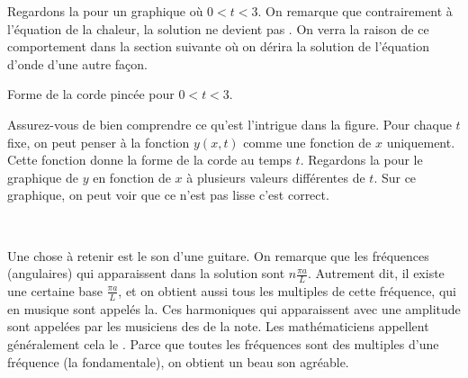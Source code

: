 \begin{example}
Regardons la 
 pour un graphique où
 $0 < t < 3$.  On remarque 
que contrairement à l'équation de la chaleur,  la solution ne devient pas
.  On verra la raison de ce comportement dans la
section suivante où on dérira la solution de l'équation d'onde d'une autre
façon.

\begin{myfig}
\capstart
{}
\caption{Forme de la corde pincée pour $0 < t < 3$.\label{wave:pluckedexfig}}
\end{myfig}

Assurez-vous de bien comprendre ce qu'est l'intrigue dans la figure.  Pour chaque $ t $ fixe,  on peut penser à la fonction
$ y (x, t) $ comme une fonction de $ x $ uniquement.  Cette fonction donne la forme de la corde
au temps $ t $.  Regardons la   pour le graphique de $ y $ en fonction de $ x $ à plusieurs valeurs différentes de $ t $.
Sur ce graphique,  on peut voir que ce n'est pas lisse c'est correct.  

\begin{myfig}
\capstart
\\[5pt]
\caption{La corde pincée pour $t=0$, $t=0.4$, $t=0.8$,  et
$t=1.2$.%
\label{wave:pluckedtsfig}}
\end{myfig}
\end{example}

Une chose à retenir est le son d'une guitare.  On remarque que
les fréquences (angulaires) qui apparaissent dans la solution sont
$n \frac{\pi a}{L}$.  Autrement dit, il existe une certaine base
\emph{} $\frac{\pi a}{L}$,  et on obtient aussi
tous les multiples de cette fréquence,  qui en musique sont appelés
la\emph{}.  Ces harmoniques qui apparaissent avec une amplitude sont 
appelées par les musiciens des  \emph{} de la note.
Les mathématiciens appellent généralement cela le \emph{}.
Parce que toutes les fréquences sont des multiples d'une fréquence (la fondamentale),
on obtient un beau son agréable.

